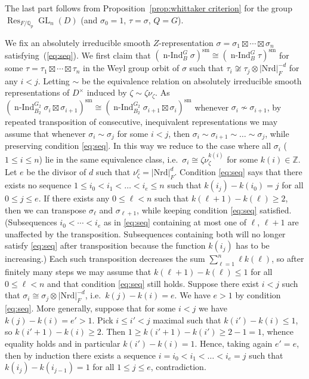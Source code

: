 \documentclass[a4paper]{amsart}
\numberwithin{equation}{section}
\theoremstyle{remark}
\theoremstyle{definition}
\DeclareMathOperator{\nInd}{n-Ind}
\DeclareMathOperator{\Res}{Res}
\newcommand{\Z}{\mathbb{Z}}
\newcommand{\Q}{\mathbb{Q}}
\DeclareMathOperator{\GL}{GL}
\newcommand{\sm}{\mathrm{sm}}
\newcommand{\Nrd}{\mathrm{Nrd}}
\renewcommand{\simeq}{\cong}
\begin{document}
The last part follows from Proposition~\ref{prop:whittaker criterion} for the group $\Res_{F/\Q_p} \GL_n(D)$ (and $\sigma_0 = 1$, $\tau = \sigma$, $Q = G$).

We fix an absolutely irreducible smooth $Z$-representation $\sigma = \sigma_{1}\boxtimes\cdots\boxtimes\sigma_{n}$ satisfying~(\ref{eq:seq}).
We first claim that $(\nInd_{B}^{G}\sigma)^{\sm} \cong (\nInd_{B}^{G}\tau)^{\sm}$ for some $\tau = \tau_{1}\boxtimes\cdots\boxtimes\tau_{n}$
in the Weyl group orbit of $\sigma$ such that $\tau_{i}\not\simeq\tau_{j}\otimes\lvert\Nrd\rvert_{F}^{-d}$ for any $i < j$.
Letting $\sim$ be the equivalence relation on absolutely irreducible smooth representations of $D^\times$ induced by $\zeta \sim \zeta \nu_{\zeta}$.
As $(\nInd_{B_{2}}^{G_{2}}\sigma_i\boxtimes \sigma_{i+1})^\sm \cong (\nInd_{B_{2}}^{G_{2}}\sigma_{i+1}\boxtimes \sigma_i)^\sm$ whenever $\sigma_i \not\sim \sigma_{i+1}$,
by repeated transposition of consecutive, inequivalent representations we may assume that whenever $\sigma_i \sim \sigma_j$ for some $i < j$, then $\sigma_i \sim \sigma_{i+1} \sim \dots \sim \sigma_j$, while preserving condition \eqref{eq:seq}.
In this way we reduce to the case where all $\sigma_i$ ($1 \le i \le n$) lie in the same equivalence class, i.e.\ $\sigma_i \cong \zeta \nu_{\zeta}^{k(i)}$ for some $k(i) \in \Z$.
Let $e$ be the divisor of $d$ such that $\nu_\zeta^e = \lvert\Nrd\rvert_{F}^{d}$.
Condition \eqref{eq:seq} says that there exists no sequence $1 \le i_0 < i_1 < \dots < i_e \le n$ such that $k(i_j) - k(i_0) = j$ for all $0 \le j \le e$.
If there exists any $0 \le \ell < n$ such that $k(\ell+1)-k(\ell) \ge 2$, then we can transpose $\sigma_{\ell}$ and $\sigma_{\ell+1}$, while keeping condition \eqref{eq:seq} satisfied.
(Subsequences $i_0 < \cdots < i_e$ as in \eqref{eq:seq} containing at most one of $\ell$, $\ell+1$ are unaffected by the transposition. Subsequences containing both will no longer satisfy \eqref{eq:seq} after transposition because the function $k(i_j)$ has to be increasing.)
Each such transposition decreases the sum $\sum_{\ell=1}^n \ell k(\ell)$, so after finitely many steps we may assume that $k(\ell+1)-k(\ell) \le 1$ for all $0 \le \ell < n$ and that condition \eqref{eq:seq} still holds.
Suppose there exist $i < j$ such that $\sigma_i \cong \sigma_j \otimes\lvert\Nrd\rvert_{F}^{-d}$, i.e.\ $k(j)-k(i) = e$.
We have $e > 1$ by condition \eqref{eq:seq}.
More generally, suppose that for some $i < j$ we have $k(j)-k(i) = e' > 1$.
Pick $i \le i' < j$ maximal such that $k(i')-k(i) \le 1$, so $k(i'+1)-k(i) \ge 2$.
Then $1 \ge k(i'+1)-k(i') \ge 2-1 = 1$, whence equality holds and in particular $k(i')-k(i) = 1$.
Hence, taking again $e'=e$, then by induction there exists a sequence $i = i_0 < i_1 < \dots < i_e = j$ such that $k(i_j)-k(i_{j-1}) = 1$ for all $1 \le j \le e$, contradiction.
\end{document}

